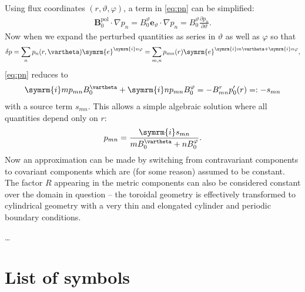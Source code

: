 \documentclass[a4paper, 10pt, english]{article}
\let\temp\varrho
\let\varrho\rho
\let\rho\temp
\let\temp\vartheta
\let\vartheta\theta
\let\theta\temp
\let\temp\varphi
\let\varphi\phi
\let\phi\temp
\let\vec\symbf
\newcommand*\e{\ensuremath{\symrm{e}}}  %
\newcommand*\im{\ensuremath{\symrm{i}}}  %
\newcommand*\pd[2][]{\ensuremath{\frac{\partial #1}{\partial #2}}}  %
\newcommand*\pol{\ensuremath{\textrm{pol}}}  %
\begin{document}
Using flux coordinates $(r, \theta, \phi)$, a term in \cref{eq:pn} can be simplified:
\begin{gather}
  \vec{B}_{0}^{\pol} \cdot \nabla p_{n} = B_{0}^{\theta} \vec{e}_{\theta} \cdot \nabla p_{n} = B_{0}^{\theta} \pd[p_{n}]{\theta}.
\end{gather}
Now when we expand the perturbed quantities as series in $\theta$ as well as $\phi$ so that
\begin{gather}
  \delta p = \sum_{n} p_n(r, \theta) \e^{\im n \phi} = \sum_{m, n} p_{mn}(r) \e^{\im m \theta + \im n \phi},
\end{gather}
\cref{eq:pn} reduces to
\begin{gather}
  \im m p_{mn} B_{0}^{\theta} + \im n p_{mn} B_{0}^{\phi} = -B_{mn}^{r} p_{0}'(r) =: -s_{mn}
\end{gather}
with a source term $s_{mn}$. This allows a simple algebraic solution where all quantities depend only on $r$:
\begin{gather}
  p_{mn} =  \frac{\im s_{mn}}{m B_{0}^{\theta} + n B_{0}^{\phi}}.
\end{gather}
Now an approximation can be made by switching from contravariant components to covariant components which are (for some reason) assumed to be constant. The factor $R$ appearing in the metric components can also be considered constant over the domain in question -- the toroidal geometry is effectively transformed to cylindrical geometry with a very thin and elongated cylinder and periodic boundary conditions.

\ldots

\appendix
\section{List of symbols}
\end{document}
